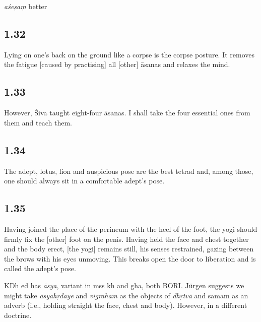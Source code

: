 \begin{ekdosis}
\begin{philcomm}[hp01_031]
\emph{aśeṣaṃ} better
\end{philcomm}

\subsection*{1.32}
\begin{translation}[hp01_032]
Lying on one’s back on the ground like a corpse is the corpse posture. It removes the fatigue [caused by practising] all [other] āsanas and relaxes the mind.
\end{translation}

\subsection*{1.33}
\begin{translation}[hp01_033]
However, Śiva taught eight-four āsanas. I shall take the four essential ones from them and teach them. 
\end{translation}

\subsection*{1.34}
\begin{translation}[hp01_034]
The adept, lotus, lion and auspicious pose are the best tetrad and, among those, one should always sit in a comfortable adept’s pose. 
\end{translation}

\subsection*{1.35}
\begin{translation}[hp01_035]
Having joined the place of the perineum with the heel of the foot, the yogi should firmly fix the [other] foot on the penis. Having held the face and chest together and the body erect, [the yogi] remains still, his senses restrained, gazing between the brows with his eyes unmoving. This breaks open the door to liberation and is called the adept’s pose.
\end{translation}

\begin{philcomm}[hp01_035]
KDh ed has \emph{āsya}, variant in mss kh and gha, both BORI.
Jürgen suggests we might take \emph{āsyahṛdaye} and \emph{vigraham} as the objects of \emph{dhṛtvā} and samam as an adverb (i.e., holding straight the face, chest and body). However, in a different doctrine.
\end{philcomm}


\end{ekdosis}
